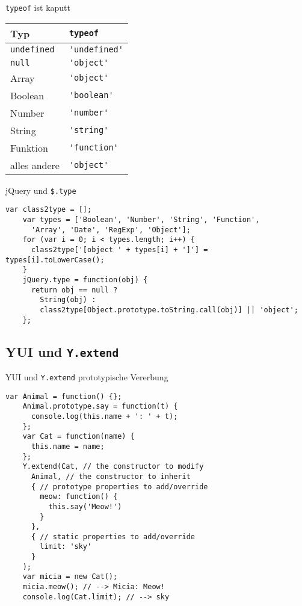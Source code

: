 \begin{frame}[fragile]{\texttt{typeof} ist kaputt}
  \begin{tabular}{ll}
    Typ & \lstinline-typeof- \\ \hline
    \lstinline-undefined- & \lstinline-'undefined'- \\
    \lstinline-null- & \lstinline-'object'- \\
    Array & \lstinline-'object'- \\
    Boolean & \lstinline-'boolean'- \\
    Number & \lstinline-'number'- \\
    String & \lstinline-'string'- \\
    Funktion & \lstinline-'function'- \\
    alles andere & \lstinline-'object'-
  \end{tabular}
\end{frame}

\begin{frame}[fragile]{jQuery und \texttt{\$.type}}
  \begin{lstlisting}[gobble=4]
    var class2type = [];
    var types = ['Boolean', 'Number', 'String', 'Function',
      'Array', 'Date', 'RegExp', 'Object'];
    for (var i = 0; i < types.length; i++) {
      class2type['[object ' + types[i] + ']'] = types[i].toLowerCase();
    }
    jQuery.type = function(obj) {
      return obj == null ?
        String(obj) :
        class2type[Object.prototype.toString.call(obj)] || 'object';
    };
  \end{lstlisting}
\end{frame}

\subsection{YUI und \texttt{Y.extend}}

\begin{frame}[fragile]{YUI und \texttt{Y.extend}}
    {prototypische Vererbung}
  \begin{lstlisting}[gobble=4]
    var Animal = function() {};
    Animal.prototype.say = function(t) {
      console.log(this.name + ': ' + t);
    };
    var Cat = function(name) {
      this.name = name;
    };
    Y.extend(Cat, // the constructor to modify
      Animal, // the constructor to inherit
      { // prototype properties to add/override
        meow: function() {
          this.say('Meow!')
        }
      }, 
      { // static properties to add/override
        limit: 'sky'
      } 
    );    
    var micia = new Cat();
    micia.meow(); // --> Micia: Meow!
    console.log(Cat.limit); // --> sky
  \end{lstlisting}
\end{frame}

